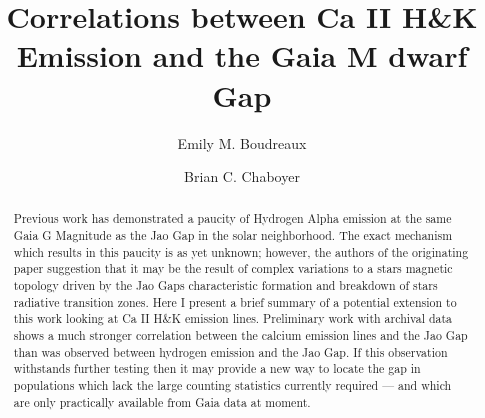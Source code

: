 \documentclass[twocolumn]{aastex62}
\begin{document}
\title{Correlations between Ca II H\&K Emission and the Gaia M dwarf Gap}


\author[0000-0002-2600-7513]{Emily M. Boudreaux}

\author[0000-0003-3096-4161]{Brian C. Chaboyer}

\received{}
\revised{}
\revised{}
\accepted{}


\begin{abstract}
Previous work has demonstrated a paucity of Hydrogen Alpha emission at the same
  Gaia G Magnitude as the Jao Gap in the solar neighborhood. The exact
  mechanism which results in this paucity is as yet unknown; however, the
  authors of the originating paper suggestion that it may be the result of
  complex variations to a stars magnetic topology driven by the Jao Gaps
  characteristic formation and breakdown of stars radiative transition zones.
  Here I present a brief summary of a potential extension to this work looking
  at Ca II H\&K emission lines. Preliminary work with archival data shows a
  much stronger correlation between the calcium emission lines and the Jao Gap
  than was observed between hydrogen emission and the Jao Gap. If this
  observation withstands further testing then it may provide a new way to
  locate the gap in populations which lack the large counting statistics
  currently required --- and which are only practically available from Gaia
  data at moment.

\end{abstract}









\acknowledgments
\end{document}
